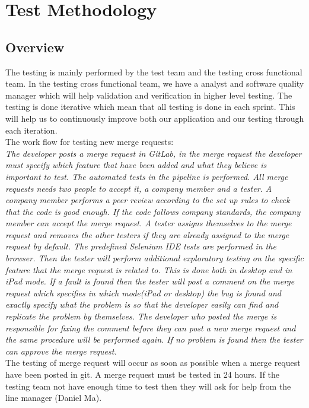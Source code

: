 \section{Test Methodology}
\subsection{Overview}
The testing is mainly performed by the test team and the testing cross functional team. In the testing cross functional team, we have a analyst and software quality manager which will help validation and verification in higher level testing. The testing is done iterative which mean that all testing is done in each sprint. This will help us to continuously improve both our application and our testing through each iteration.\\

\noindent The work flow for testing new merge requests:\\
 \emph{The developer posts a merge request in GitLab, in the merge request the developer must specify which feature that have been added and what they believe is important to test. The automated tests in the pipeline is performed. All merge requests needs two people to accept it, a company member and a tester. A company member performs a peer review according to the set up rules to check that the code is good enough. If the code follows company standards, the company member can accept the merge request. A tester assigns themselves to the merge request and removes the other testers if they are already assigned to the merge request by default. The predefined Selenium IDE tests are performed in the browser. Then the tester will perform additional exploratory testing on the specific feature that the merge request is related to. This is done both in desktop and in iPad mode. If a fault is found then the tester will post a comment on the merge request which specifies in which mode(iPad or desktop) the bug is found and exactly specify what the problem is so that the developer easily can find and replicate the problem by themselves. The developer who posted the merge is responsible for fixing the comment before they can post a new merge request and the same procedure will be performed again. If no problem is found then the tester can approve the merge request.}\\
 
 \noindent The testing of merge request will occur as soon as possible when a merge request have been posted in git. A merge request must be tested in 24 hours. If the testing team not have enough time to test then they will ask for help from the line manager (Daniel Ma).

